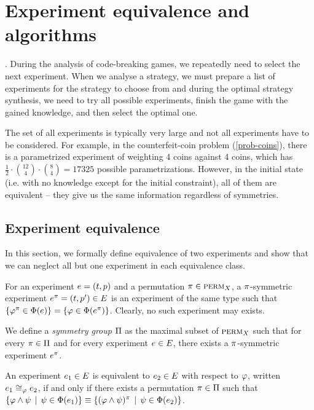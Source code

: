 \chapter{Experiment equivalence and algorithms} \label{ch:expeq}

.
During the analysis of code-breaking games,
  we repeatedly need to select the next experiment.
When we analyse a strategy, we must prepare a list of experiments
  for the strategy to choose from and
  during the optimal strategy synthesis,
  we need to try all possible experiments, finish the game with the gained knowledge,
  and then select the optimal one.

The set of all experiments is typically very large and not all experiments
  have to be considered.
For example, in the counterfeit-coin problem (\ref{prob-coins}),
  there is a parametrized experiment of weighting 4 coins against 4 coins,
  which has $\frac{1}{2}\cdot {12 \choose 4}\cdot{8 \choose 4} = 17325$
 possible parametrizations.
However, in the initial state
  (i.e. with no knowledge except for the initial constraint),
  all of them are equivalent -- they give us
  the same information regardless of symmetries.

\section{Experiment equivalence}

In this section, we formally define equivalence of two experiments
 and show that we can neglect all but one experiment in each equivalence class.

\begin{definition}
For an experiment $e = (t, p)$ and a permutation $\pi\in\textsc{perm}_X$,
  a $\pi$-symmetric experiment $e^\pi = (t, p')\in E$
  is an experiment of the same type such that
  $\{\varphi^\pi \in\Phi(e)\} = \{\varphi\in\Phi(e^\pi)\}$.
Clearly, no such experiment may exists.
\end{definition}

\begin{definition}
We define a \emph{symmetry group} $\Pi$ as
  the maximal subset of $\textsc{perm}_X$ such that for
  every $\pi\in\Pi$ and for every experiment $e\in E$,
  there exists a $\pi$-symmetric experiment $e^\pi$.
\end{definition}

\begin{definition} \label{def:expeq}
An experiment $e_1\in E$ is equivalent to $e_2\in E$ with respect to $\varphi$,
  written $e_1\cong_{\varphi}e_2$,
  if and only if there exists a permutation $\pi\in\Pi$ such that
 $ \{ \varphi\wedge\psi \:\:|\:\: \psi\in\Phi(e_1) \} \equiv
   \{ (\varphi\wedge\psi)^\pi \:\:|\:\: \psi\in\Phi(e_2) \} $.
\end{definition}

